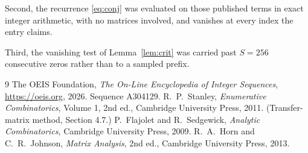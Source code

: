 \documentclass[11pt,a4paper]{article}
\theoremstyle{plain}
\theoremstyle{definition}
\begin{document}
Second, the recurrence \eqref{eq:conj} was evaluated on those published terms in exact
integer arithmetic, with no matrices involved, and vanishes at every index the entry claims.

Third, the vanishing test of Lemma~\ref{lem:crit} was carried past $S=256$ consecutive
zeros rather than to a sampled prefix.

\begin{thebibliography}{9}
 The OEIS Foundation, \emph{The On-Line Encyclopedia of Integer
Sequences}, \url{https://oeis.org}, 2026. Sequence A304129.
 R.~P.~Stanley, \emph{Enumerative Combinatorics}, Volume 1, 2nd ed.,
Cambridge University Press, 2011. (Transfer-matrix method, Section 4.7.)
 P.~Flajolet and R.~Sedgewick, \emph{Analytic Combinatorics}, Cambridge
University Press, 2009.
 R.~A.~Horn and C.~R.~Johnson, \emph{Matrix Analysis}, 2nd ed., Cambridge
University Press, 2013.
\end{thebibliography}
\end{document}
